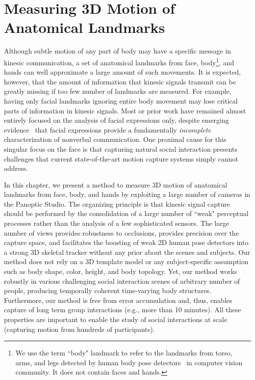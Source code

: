 
\chapter{Measuring 3D Motion of Anatomical Landmarks}
\label{chapter:mocap}

Although subtle motion of any part of body may have a specific message in kinesic communication, a set of anatomical landmarks from face, body\footnote{We use the term ``body" landmark to refer to the landmarks from torso, arms, and legs detected by human body pose detectors~\cite{Belagiannis2014, wei2016convolutional} in computer vision community. It does not contain faces and hands.}, and hands can well approximate a large amount of such movements. It is expected, however, that the amount of information that kinesic signals transmit can be greatly missing if too few number of landmarks are measured. For example, having only facial landmarks ignoring entire body movement may lose critical parts of information in kinesic signals. Most or prior work have remained almost entirely focused on the analysis of facial expressions only, despite emerging evidence~\cite{Meeren-2005,Aviezer-2012} that facial expressions provide a fundamentally \emph{incomplete} characterization of nonverbal communication. One proximal cause for this singular focus on the face is that capturing natural social interaction presents challenges that current state-of-the-art motion capture systems simply cannot address. %

In this chapter, we present a method to measure 3D motion of anatomical landmarks from face, body, and hands by exploiting a large number of cameras in the Panoptic Studio. The organizing principle is that kinesic signal capture should be performed by the consolidation of a large number of ``weak" perceptual processes rather than the analysis of a few sophisticated sensors. The large number of views provides robustness to occlusions, provides precision over the capture space, and facilitates the boosting of weak 2D human pose detectors into a strong 3D skeletal tracker without any prior about the scenes and subjects. Our method does not rely on a 3D template model or any subject-specific assumption such as body shape, color, height, and body topology. Yet, our method works robustly in various challenging social interaction scenes of arbitrary number of people, producing temporally coherent time-varying body structures. Furthermore, our method is free from error accumulation and, thus, enables capture of long term group interactions (e.g., more than 10 minutes). All these properties are important to enable the study of social interactions at scale (capturing motion from hundreds of participants). 

